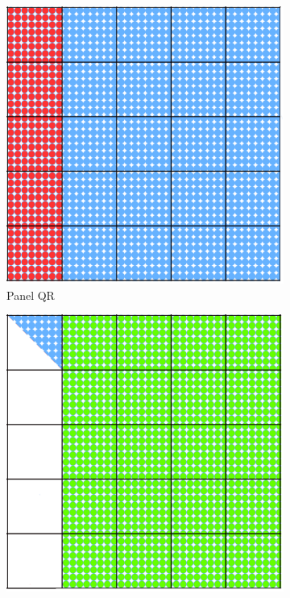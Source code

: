\begin{figure}[h!]
  \captionsetup[subfigure]{justification=justified,singlelinecheck=false}

  \begin{subfigure}[t]{0.2 \textwidth}
    \includegraphics[width=\textwidth]{fig/SVD_panel_1_grid}
    \caption{\label{fig:qr_1}\small{Panel QR}}
  \end{subfigure}
  \hfill
  \begin{subfigure}[t]{0.2 \textwidth}
    \includegraphics[width=\textwidth]{fig/SVD_panel_2_grid}

\end{subfigure}
\end{figure}
